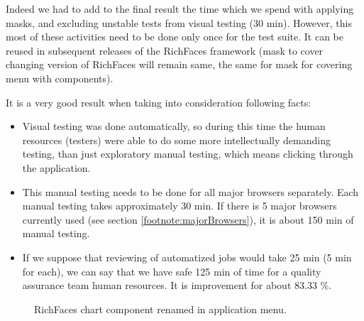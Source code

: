 \documentclass[11pt,oneside,final]{fithesis2}
\begin{document}
  Indeed we had to add to the final result the time which we spend with applying masks, and excluding unstable tests from visual
  testing (30 min). However, this most of these activities need to be done only once for the test suite. It can be reused in subsequent
  releases of the RichFaces framework (mask to cover changing version of RichFaces will remain same, the same for mask for covering
  menu with components).
  
  It is a very good result when taking into consideration following facts:
  
  \begin{itemize}
   \item Visual testing was done automatically, so during this time the human resources (testers) were able to do some more 
   intellectually demanding testing, than just exploratory manual testing, which means clicking through the application.
   \item This manual testing needs to be done for all major browsers separately. Each manual testing takes approximately 30 min.
         If there is 5 major browsers currently used (see section \ref{footnote:majorBrowsers}), it is about 150 min of manual testing.
   \item If we suppose that reviewing of automatized jobs would take 25 min (5 min for each), we can say that we have safe
	 125 min of time for a quality assurance team human resources. It is improvement for about 83.33 \%.
  \end{itemize}

  
  \begin{figure}[!htb]
      \begin{center}
      \leavevmode
      \centerline{}
      \end{center}
      \caption{RichFaces chart component renamed in application menu.}
      \label{fig:chartComponentRenamed}
  \end{figure}
  
\end{document}

